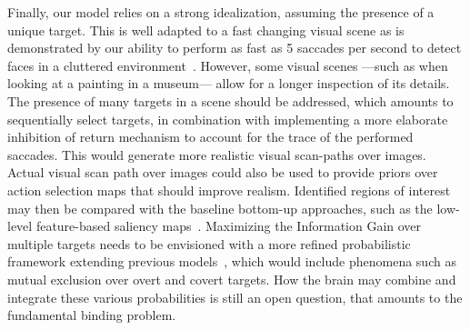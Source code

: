 Finally, our model relies on a strong idealization, assuming the presence of a unique target. This is well adapted to a fast changing visual scene as is demonstrated by our ability to perform as fast as 5 saccades per second to detect faces in a cluttered environment~\cite{Martin18}. However, some visual scenes ---such as when looking at a painting in a museum--- allow for a longer inspection of its details.  The presence of many targets in a scene should be addressed, which amounts to sequentially select targets, in combination with implementing a more elaborate inhibition of return mechanism to account for the trace of the performed saccades. This would generate more realistic visual scan-paths over images. Actual visual scan path over images could also be used to provide priors over action selection maps that should improve realism.  Identified regions of interest may then be compared with the baseline bottom-up approaches, such as the low-level feature-based saliency maps~\cite{Itti01}. Maximizing the Information Gain over multiple targets needs to be envisioned with a more refined probabilistic framework extending previous models~\cite{Friston12}, which would include phenomena such as mutual exclusion over overt and covert targets. How the brain may combine and integrate these various probabilities is still an open question, that amounts to the fundamental binding problem.
